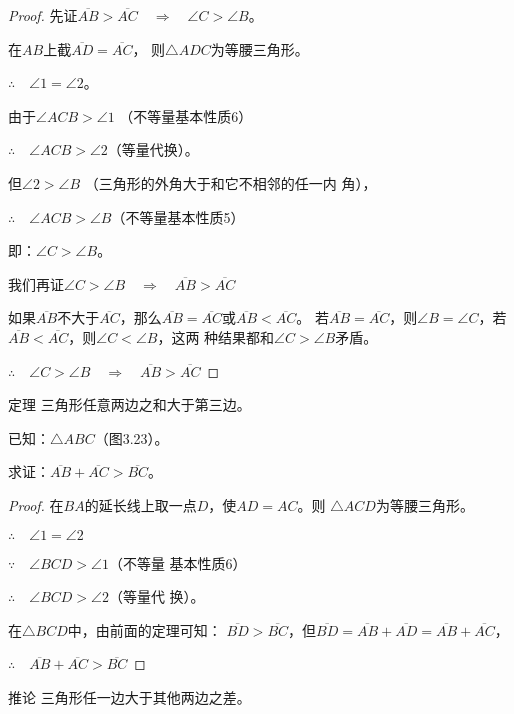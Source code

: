 \begin{proof}
    先证$\overline{AB}>\overline{AC}\quad\Rightarrow\quad \angle C>\angle B$。

在$AB$上截$\overline{AD}=\overline{AC}$，
则$\triangle ADC$为等腰三角形。

$\therefore\quad \angle 1=\angle 2$。

由于$\angle ACB>\angle 1$ （不等量基本性质6）

$\therefore\quad \angle ACB>\angle 2$（等量代换）。

但$\angle 2>\angle B$ （三角形的外角大于和它不相邻的任一内
角），

$\therefore\quad \angle ACB>\angle B$（不等量基本性质5）

即：$\angle C>\angle B$。

我们再证$\angle C>\angle B\quad \Rightarrow\quad \overline{AB}>\overline{AC}$

如果$\overline{AB}$不大于$\overline{AC}$，那么$\overline{AB}=\overline{AC}$或$\overline{AB}<\overline{AC}$。
若$\overline{AB}=\overline{AC}$，则$\angle B=\angle C$，若$\overline{AB}<\overline{AC}$，则$\angle C<\angle B$，这两
种结果都和$\angle C>\angle B$矛盾。

$\therefore\quad \angle C>\angle B\quad \Rightarrow\quad \overline{AB}>\overline{AC}$
\end{proof}

\begin{Theorem}{定理}
    三角形任意两边之和大于第三边。
\end{Theorem}
 
已知：$\triangle ABC$（图3.23）。

求证：$\overline{AB}+\overline{AC}>\overline{BC}$。

\begin{proof}
    在$BA$的延长线上取一点$D$，使$AD=AC$。则
    $\triangle ACD$为等腰三角形。
  
    $\therefore\quad \angle 1=\angle 2$

    $\because\quad \angle BCD>\angle 1$（不等量
    基本性质6）

$\therefore\quad \angle BCD>\angle 2$（等量代
    换）。

    在$\triangle BCD$中，由前面的定理可知：
    $\overline{BD}>\overline{BC}$，但$\overline{BD}=\overline{AB}+\overline{AD}=\overline{AB}+\overline{AC}$，
 
   $\therefore\quad  \overline{AB}+\overline{AC}>\overline{BC}$
\end{proof}

\begin{Deduction}{推论}
三角形任一边大于其他两边之差。
\end{Deduction}


